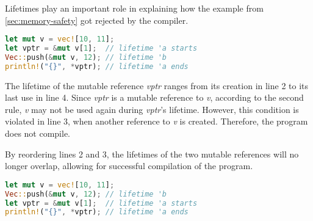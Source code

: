 \documentclass[sigplan,11pt,nonacm]{acmart}
\begin{document}
Lifetimes play an important role in explaining how the example from \ref{sec:memory-safety} got rejected by the compiler.

\begin{lstlisting}[language=Rust]
let mut v = vec![10, 11];
let vptr = &mut v[1];  // lifetime 'a starts
Vec::push(&mut v, 12); // lifetime 'b
println!("{}", *vptr); // lifetime 'a ends
\end{lstlisting}

The lifetime of the mutable reference \emph{vptr} ranges from its creation in line 2 to its last use in line 4.
Since \emph{vptr} is a mutable reference to \emph{v}, according to the second rule, \emph{v} may not be used again during \emph{vptr}'s lifetime.
However, this condition is violated in line 3, when another reference to \emph{v} is created.
Therefore, the program does not compile.

By reordering lines 2 and 3, the lifetimes of the two mutable references will no longer overlap, allowing for successful compilation of the program.
\begin{lstlisting}[language=Rust]
let mut v = vec![10, 11];
Vec::push(&mut v, 12); // lifetime 'b
let vptr = &mut v[1];  // lifetime 'a starts
println!("{}", *vptr); // lifetime 'a ends
\end{lstlisting}







\end{document}

